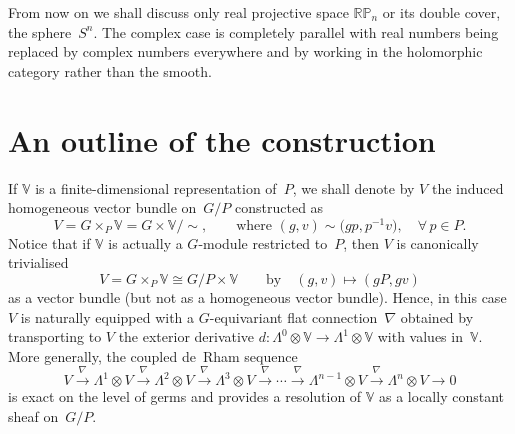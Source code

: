 \documentclass[11pt]{article}
\begin{document}
From now on we shall discuss only real projective space ${\mathbb{RP}}_n$ or
its double cover, the sphere~$S^n$. The complex case is completely parallel
with real numbers being replaced by complex numbers everywhere and by working
in the holomorphic category rather than the smooth.

\section{An outline of the construction}\label{outline}

If ${\mathbb{V}}$ is a f\/inite-dimensional representation of~$P$, we shall
denote by $V$ the induced homogeneous vector bundle on~$G/P$ constructed as
\[V=G\times_P{\mathbb{V}}=G\times{\mathbb{V}}/\sim,
\qquad\mbox{where }(g,v)\sim\big(g p,p^{-1}v\big),\quad \forall\, p\in P.\]
Notice that if ${\mathbb{V}}$ is actually a $G$-module restricted to~$P$, then
$V$ is canonically trivialised
\begin{equation}\label{twist}
V=G\times_P{\mathbb{V}}\cong G/P\times{\mathbb{V}}\qquad\mbox{by}\quad
(g,v)\mapsto(gP,g v)\end{equation}
as a vector bundle (but not as a homogeneous vector bundle). Hence, in this
case $V$ is naturally equipped with a $G$-equivariant f\/lat connection~$\nabla$
obtained by transporting to $V$ the exterior derivative
$d:\Lambda^0\otimes{\mathbb{V}}\to\Lambda^1\otimes{\mathbb{V}}$ with
values in~${\mathbb{V}}$. More generally, the coupled de~Rham sequence
\begin{equation}\label{coupled}V\xrightarrow{\,\nabla\,}\Lambda^1\otimes V
\xrightarrow{\,\nabla\,}\Lambda^2\otimes V
\xrightarrow{\,\nabla\,}\Lambda^3\otimes V \xrightarrow{\,\nabla\,}\cdots
\xrightarrow{\,\nabla\,}\Lambda^{n-1}\otimes V
\xrightarrow{\,\nabla\,}\Lambda^n\otimes V\to 0\end{equation} is exact on the
level of germs and provides a resolution of ${\mathbb{V}}$ as a locally
constant sheaf on~$G/P$.
\end{document}
